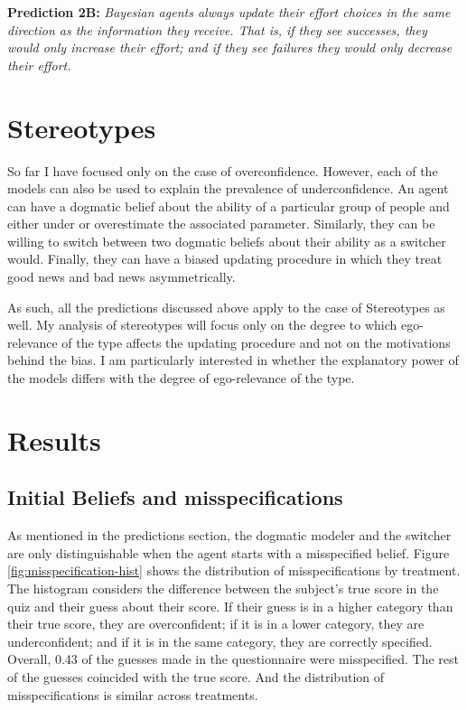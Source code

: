 \documentclass[
  12pt,
]{article}
\begin{document}
\textbf{Prediction 2B:} \emph{Bayesian agents always update their effort
choices in the same direction as the information they receive. That is,
if they see successes, they would only increase their effort; and if
they see failures they would only decrease their effort.}

\hypertarget{stereotypes}{%
\section{Stereotypes}\label{stereotypes}}

So far I have focused only on the case of overconfidence. However, each
of the models can also be used to explain the prevalence of
underconfidence. An agent can have a dogmatic belief about the ability
of a particular group of people and either under or overestimate the
associated parameter. Similarly, they can be willing to switch between
two dogmatic beliefs about their ability as a switcher would. Finally,
they can have a biased updating procedure in which they treat good news
and bad news asymmetrically.

As such, all the predictions discussed above apply to the case of
Stereotypes as well. My analysis of stereotypes will focus only on the
degree to which ego-relevance of the type affects the updating procedure
and not on the motivations behind the bias. I am particularly interested
in whether the explanatory power of the models differs with the degree
of ego-relevance of the type.

\hypertarget{results}{%
\section{Results}\label{results}}

\hypertarget{initial-beliefs-and-misspecifications}{%
\subsection{Initial Beliefs and
misspecifications}\label{initial-beliefs-and-misspecifications}}

As mentioned in the predictions section, the dogmatic modeler and the
switcher are only distinguishable when the agent starts with a
misspecified belief. Figure \ref{fig:misspecification-hist} shows the
distribution of misspecifications by treatment. The histogram considers
the difference between the subject's true score in the quiz and their
guess about their score. If their guess is in a higher category than
their true score, they are overconfident; if it is in a lower category,
they are underconfident; and if it is in the same category, they are
correctly specified. Overall, 0.43 of the guesses made in the
questionnaire were misspecified. The rest of the guesses coincided with
the true score. And the distribution of misspecifications is similar
across treatments.
\end{document}
